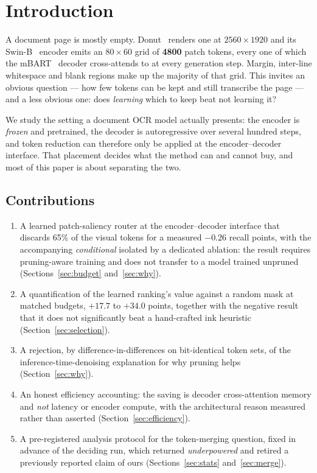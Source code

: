 \documentclass[conference]{IEEEtran}
\begin{document}
\section{Introduction}

A document page is mostly empty. Donut~\cite{donut} renders one at $2560 \times 1920$ and its
Swin-B~\cite{swin} encoder emits an $80 \times 60$ grid of \textbf{4800} patch tokens, every
one of which the mBART~\cite{mbart} decoder cross-attends to at every generation step.
Margin, inter-line whitespace and blank regions make up the majority of that grid. This
invites an obvious question --- how few tokens can be kept and still transcribe the page ---
and a less obvious one: does \emph{learning} which to keep beat not learning it?

We study the setting a document OCR model actually presents: the encoder is \emph{frozen} and
pretrained, the decoder is autoregressive over several hundred steps, and token reduction can
therefore only be applied at the encoder--decoder interface. That placement decides what the
method can and cannot buy, and most of this paper is about separating the two.

\subsection{Contributions}

\begin{enumerate}
\item A learned patch-saliency router at the encoder--decoder interface that discards 65\% of
the visual tokens for a measured $-0.26$ recall points, with the accompanying
\emph{conditional} isolated by a dedicated ablation: the result requires pruning-aware
training and does not transfer to a model trained unpruned
(Sections~\ref{sec:budget} and~\ref{sec:why}).
\item A quantification of the learned ranking's value against a random mask at matched
budgets, $+17.7$ to $+34.0$ points, together with the negative result that it does not
significantly beat a hand-crafted ink heuristic (Section~\ref{sec:selection}).
\item A rejection, by difference-in-differences on bit-identical token sets, of the
inference-time-denoising explanation for why pruning helps (Section~\ref{sec:why}).
\item An honest efficiency accounting: the saving is decoder cross-attention memory and
\emph{not} latency or encoder compute, with the architectural reason measured rather than
asserted (Section~\ref{sec:efficiency}).
\item A pre-registered analysis protocol for the token-merging question, fixed in advance of
the deciding run, which returned \emph{underpowered} and retired a previously reported claim
of ours (Sections~\ref{sec:stats} and~\ref{sec:merge}).
\end{enumerate}
\end{document}
